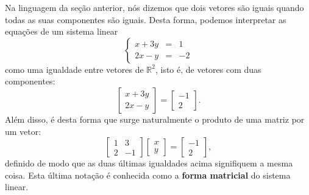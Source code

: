Na linguagem da seção anterior, nós dizemos que dois vetores são iguais quando todas as suas componentes são iguais. Desta forma, podemos interpretar as equações de um sistema linear
\begin{equation}
  \left\{
    \begin{array}{rcl}
      x+3y&=&1 \\
      2x-y&=&-2
    \end{array}
  \right.
\end{equation} como uma igualdade entre vetores de $\mathbb{R}^2$, isto é, de vetores com duas componentes:
\begin{equation}
  \left[
    \begin{array}{c}
      x+3y \\
      2x-y
    \end{array}
  \right] =
    \left[
    \begin{array}{c}
      -1 \\
      2
    \end{array}
  \right].
\end{equation} Além disso, é desta forma que surge naturalmente o produto de uma matriz por um vetor:
\begin{equation}
  \left[
    \begin{array}{cc}
      1 & 3 \\
      2 & -1
    \end{array}
  \right]
  \left[
    \begin{array}{c}
      x \\
      y
    \end{array}
  \right] =
    \left[
    \begin{array}{c}
      -1 \\
      2
    \end{array}
  \right],
\end{equation} definido de modo que as duas últimas igualdades acima signifiquem a mesma coisa. Esta última notação é conhecida como a \textbf{forma matricial} do sistema linear.




